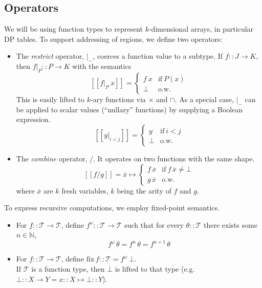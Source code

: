 \documentclass{article}
\newcommand\newterm[1]{{\it #1}}
\newcommand\N{\mathbb{N}}
\newcommand\T{\mathcal{T}}
\newcommand\semp[1]{[\![{#1}]\!]}
\begin{document}
\subsection{Operators}

We will be using function types to represent $k$-dimensional arrays, in particular DP tables.
To support addressing of regions, we define two operators:

\begin{itemize}
  \item The \newterm{restrict} operator, $\big|_-$, coerces a function value to a subtype. 
    If $f::J\to K$, then $f\big|_P :: P\to K$
    with the semantics
    \[\semp{f\big|_P\ x} = \begin{cases}f\ x & \textrm{if}~P(x)\\ \bot & \textrm{o.w.}\end{cases}\]
    This is easily lifted to $k$-ary functions via $\times$ and $\cap$.
    As a special case, $\big|_-$ can be applied to scalar values (``nullary'' functions)
    by supplying a Boolean expression.
    \[\semp{y\big|_{i<j}} = \begin{cases}y & \textrm{if}~i<j \\ \bot & \textrm{o.w.}\end{cases}\]
  \item The \newterm{combine} operator, $/$. It operates on two functions with the same shape.
    \[\semp{f / g} = \overline{x}\mapsto\begin{cases}f\,\overline{x} & \textrm{if}~f\,\overline{x}\neq\bot \\ 
                                                     g\,\overline{x} & \textrm{o.w.}\end{cases}\]
    where $\overline{x}$ are $k$ fresh variables, $k$ being the arity of $f$ and $g$.
\end{itemize}

To express recursive computations, we employ fixed-point semantics.

\newcommand\fix{\mathrm{fix}\,}

\begin{itemize}
  \item For $f :: \T\to\T$, define $f^\omega :: \T\to\T$ such that for every $\theta :: \T$ there exists some $n\in\N$,
    \[f^\omega\,\theta = f^n\,\theta = f^{n+1}\,\theta\]
  \item For $f :: \T\to\T$, define $\fix f :: \T = f^\omega\,\bot$.\\
    If $\T$ is a function type, then $\bot$ is lifted to that type (e.g. $\bot :: X\to Y = x :: X \mapsto \bot :: Y$).
\end{itemize}
\end{document}
